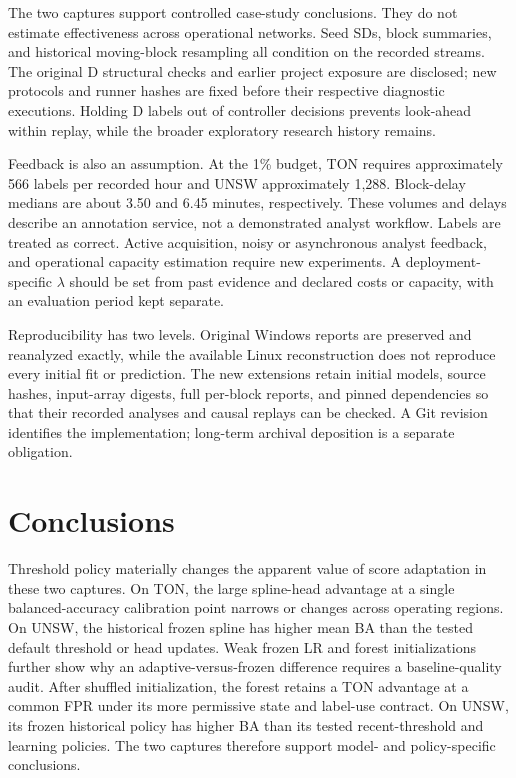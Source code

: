 The two captures support controlled case-study conclusions. They do not estimate effectiveness across operational networks. Seed SDs, block summaries, and historical moving-block resampling all condition on the recorded streams. The original D structural checks and earlier project exposure are disclosed; new protocols and runner hashes are fixed before their respective diagnostic executions. Holding D labels out of controller decisions prevents look-ahead within replay, while the broader exploratory research history remains.

Feedback is also an assumption. At the 1\% budget, TON requires approximately 566 labels per recorded hour and UNSW approximately 1,288. Block-delay medians are about 3.50 and 6.45 minutes, respectively. These volumes and delays describe an annotation service, not a demonstrated analyst workflow. Labels are treated as correct. Active acquisition, noisy or asynchronous analyst feedback, and operational capacity estimation require new experiments. A deployment-specific $\lambda$ should be set from past evidence and declared costs or capacity, with an evaluation period kept separate.

Reproducibility has two levels. Original Windows reports are preserved and reanalyzed exactly, while the available Linux reconstruction does not reproduce every initial fit or prediction. The new extensions retain initial models, source hashes, input-array digests, full per-block reports, and pinned dependencies so that their recorded analyses and causal replays can be checked. A Git revision identifies the implementation; long-term archival deposition is a separate obligation.

\section{Conclusions}
Threshold policy materially changes the apparent value of score adaptation in these two captures. On TON, the large spline-head advantage at a single balanced-accuracy calibration point narrows or changes across operating regions. On UNSW, the historical frozen spline has higher mean BA than the tested default threshold or head updates. Weak frozen LR and forest initializations further show why an adaptive-versus-frozen difference requires a baseline-quality audit. After shuffled initialization, the forest retains a TON advantage at a common FPR under its more permissive state and label-use contract. On UNSW, its frozen historical policy has higher BA than its tested recent-threshold and learning policies. The two captures therefore support model- and policy-specific conclusions.

